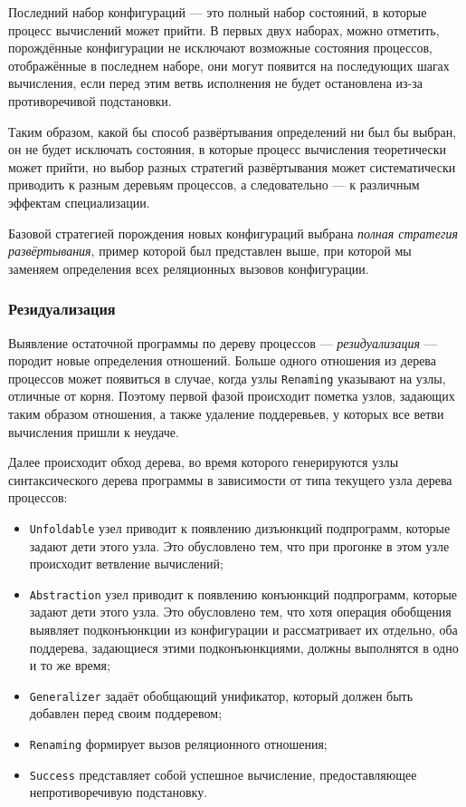 Последний набор конфигураций --- это полный набор состояний, в которые процесс вычислений может
прийти. В первых двух наборах, можно отметить, порождённые конфигурации не исключают
возможные состояния процессов, отображённые в последнем наборе, они могут появится на последующих шагах вычисления,
если перед этим ветвь исполнения не будет остановлена из-за противоречивой подстановки.

Таким образом, какой бы способ развёртывания определений ни был бы выбран, он не будет
исключать состояния, в которые процесс вычисления теоретически может прийти, но выбор
разных стратегий развёртывания может систематически приводить к разным деревьям процессов,
а следовательно --- к различным эффектам специализации.

Базовой стратегией порождения новых конфигураций выбрана \emph{полная стратегия развёртывания},
пример которой был представлен выше, при которой мы заменяем определения всех реляционных вызовов
конфигурации.


\subsubsection{Резидуализация}

Выявление остаточной программы по дереву процессов --- \emph{резидуализация} ---
породит новые определения отношений. Больше одного отношения из дерева процессов может
появиться в случае, когда узлы \lstinline{Renaming} указывают на узлы, отличные от корня.
Поэтому первой фазой происходит пометка узлов, задающих таким образом отношения,
а также удаление поддеревьев, у которых все ветви вычисления пришли к неудаче.

Далее происходит обход дерева, во время которого генерируются узлы синтаксического дерева программы
в зависимости от типа текущего узла дерева процессов:
\begin{itemize}
\item \lstinline{Unfoldable} узел приводит к появлению дизъюнкций подпрограмм, которые задают дети этого узла.
      Это обусловлено тем, что при прогонке в этом узле происходит ветвление вычислений;
\item \lstinline{Abstraction} узел приводит к появлению конъюнкций подпрограмм, которые задают дети этого узла.
	  Это обусловлено тем, что хотя операция обобщения выявляет подконъюнкции из конфигурации и рассматривает их отдельно,
	  оба поддерева, задающиеся этими подконъюнкциями, должны выполнятся в одно и то же время;
\item \lstinline{Generalizer} задаёт обобщающий унификатор, который должен быть добавлен
      перед своим поддеревом;
\item \lstinline{Renaming} формирует вызов реляционного отношения;
\item \lstinline{Success} представляет собой успешное вычисление, предоставляющее непротиворечивую подстановку.
\end{itemize}


